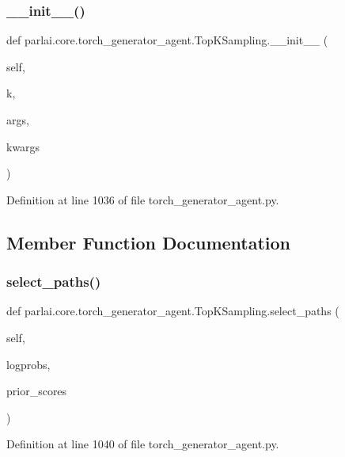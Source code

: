 \subsubsection{\texorpdfstring{\+\_\+\+\_\+init\+\_\+\+\_\+()}{\_\_init\_\_()}}
{\footnotesize\ttfamily def parlai.\+core.\+torch\+\_\+generator\+\_\+agent.\+Top\+K\+Sampling.\+\_\+\+\_\+init\+\_\+\+\_\+ (\begin{DoxyParamCaption}\item[{}]{self,  }\item[{}]{k,  }\item[{}]{args,  }\item[{}]{kwargs }\end{DoxyParamCaption})}



Definition at line 1036 of file torch\+\_\+generator\+\_\+agent.\+py.



\subsection{Member Function Documentation}
\mbox{\label{classparlai_1_1core_1_1torch__generator__agent_1_1TopKSampling_a3ca83b8ee8aff13c05afbb973f948b6f}} 
\subsubsection{\texorpdfstring{select\+\_\+paths()}{select\_paths()}}
{\footnotesize\ttfamily def parlai.\+core.\+torch\+\_\+generator\+\_\+agent.\+Top\+K\+Sampling.\+select\+\_\+paths (\begin{DoxyParamCaption}\item[{}]{self,  }\item[{}]{logprobs,  }\item[{}]{prior\+\_\+scores }\end{DoxyParamCaption})}



Definition at line 1040 of file torch\+\_\+generator\+\_\+agent.\+py.



